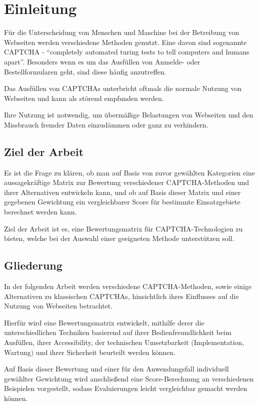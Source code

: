 \chapter{Einleitung}
\label{ch:intro}

Für die Unterscheidung von Menschen und Maschine bei der Betreibung von Webseiten werden verschiedene Methoden genutzt.
Eine davon sind sogenannte CAPTCHA - ``completely automated turing tests to tell computers and humans apart''.
Besonders wenn es um das Ausfüllen von Anmelde- oder Bestellformularen geht, sind diese häufig anzutreffen.

Das Ausfüllen von CAPTCHAs unterbricht oftmals die normale Nutzung von Webseiten und kann als störend empfunden werden.

Ihre Nutzung ist notwendig, um übermäßige Belastungen von Webseiten und den Missbrauch fremder Daten einzudämmen oder ganz zu verhindern.




%
%
\section{Ziel der Arbeit}
\label{sec:intro:goal}
Es ist die Frage zu klären, ob man auf Basis von zuvor gewählten Kategorien eine aussagekräftige Matrix zur
Bewertung verschiedener CAPTCHA-Methoden und ihrer Alternativen entwickeln kann, und ob auf Basis dieser Matrix und einer gegebenen Gewichtung
ein vergleichbarer Score für bestimmte Einsatzgebiete berechnet werden kann.

Ziel der Arbeit ist es, eine Bewertungsmatrix für CAPTCHA-Technologien zu bieten, welche bei der Auswahl einer geeigneten Methode unterstützen soll.
%
%
\section{Gliederung}
\label{sec:intro:structure}
In der folgenden Arbeit werden verschiedene CAPTCHA-Methoden, sowie einige Alternativen zu klassischen CAPTCHAs,
hinsichtlich ihres Einflusses auf die Nutzung von Webseiten betrachtet.

Hierfür wird eine Bewertungsmatrix entwickelt, mithilfe derer die unterschiedlichen Techniken basierend auf
ihrer Bedienfreundlichkeit beim Ausfüllen, ihrer Accessibility, der technischen Umsetzbarkeit $($Implementation, Wartung$)$ und ihrer Sicherheit beurteilt werden können.

Auf Basis dieser Bewertung und einer für den Anwendungsfall individuell gewählter Gewichtung wird anschließend eine Score-Berechnung 
an verschiedenen Beispielen vorgestellt, sodass Evaluierungen leicht vergleichbar gemacht werden können.